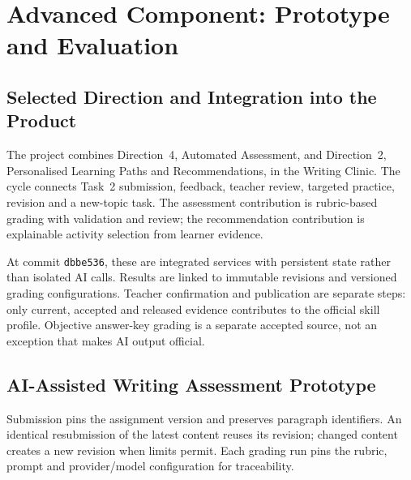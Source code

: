 
\section{Advanced Component: Prototype and Evaluation}
\label{sec:advanced}

\subsection{Selected Direction and Integration into the Product}
The project combines Direction~4, Automated Assessment, and Direction~2,
Personalised Learning Paths and Recommendations, in the Writing Clinic.
The cycle connects Task~2 submission, feedback, teacher review, targeted
practice, revision and a new-topic task. The assessment contribution is
rubric-based grading with validation and review; the recommendation
contribution is explainable activity selection from learner evidence.

At commit \texttt{dbbe536}, these are integrated services with persistent
state rather than isolated AI calls. Results are linked to immutable
revisions and versioned grading configurations. Teacher confirmation and
publication are separate steps: only current, accepted and released
evidence contributes to the official skill profile. Objective answer-key
grading is a separate accepted source, not an exception that makes AI
output official.

\subsection{AI-Assisted Writing Assessment Prototype}
Submission pins the assignment version and preserves paragraph identifiers.
An identical resubmission of the latest content reuses its revision; changed
content creates a new revision when limits permit. Each grading run pins
the rubric, prompt and provider/model configuration for traceability.


